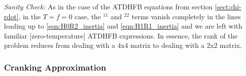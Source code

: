 \noindent\textit{Sanity Check:} As in the case of the ATDHFB equations from section \ref{sect:chi-rdot}, in the $T=f=0$ case, the $^{11}$ and $^{22}$ terms vanish completely in the lines leading up to \ref{eqn:H0R2_inertia} and \ref{eqn:H1R1_inertia} and we are left with familiar [zero-temperature] ATDHFB expressions. In essence, the rank of the problem reduces from dealing with a 4x4 matrix to dealing with a 2x2 matrix.



\subsubsection{Cranking Approximation}

